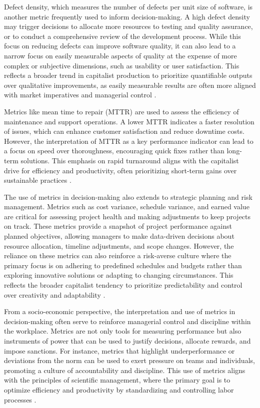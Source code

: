 \begin{refsection}
Defect density, which measures the number of defects per unit size of software, is another metric frequently used to inform decision-making. A high defect density may trigger decisions to allocate more resources to testing and quality assurance, or to conduct a comprehensive review of the development process. While this focus on reducing defects can improve software quality, it can also lead to a narrow focus on easily measurable aspects of quality at the expense of more complex or subjective dimensions, such as usability or user satisfaction. This reflects a broader trend in capitalist production to prioritize quantifiable outputs over qualitative improvements, as easily measurable results are often more aligned with market imperatives and managerial control \cite[pp.~47-49]{McConnell2004CodeComplete}.

Metrics like mean time to repair (MTTR) are used to assess the efficiency of maintenance and support operations. A lower MTTR indicates a faster resolution of issues, which can enhance customer satisfaction and reduce downtime costs. However, the interpretation of MTTR as a key performance indicator can lead to a focus on speed over thoroughness, encouraging quick fixes rather than long-term solutions. This emphasis on rapid turnaround aligns with the capitalist drive for efficiency and productivity, often prioritizing short-term gains over sustainable practices \cite[pp.~233-236]{Allspaw2010WebOperations}.

The use of metrics in decision-making also extends to strategic planning and risk management. Metrics such as cost variance, schedule variance, and earned value are critical for assessing project health and making adjustments to keep projects on track. These metrics provide a snapshot of project performance against planned objectives, allowing managers to make data-driven decisions about resource allocation, timeline adjustments, and scope changes. However, the reliance on these metrics can also reinforce a risk-averse culture where the primary focus is on adhering to predefined schedules and budgets rather than exploring innovative solutions or adapting to changing circumstances. This reflects the broader capitalist tendency to prioritize predictability and control over creativity and adaptability \cite[pp.~110-113]{Fleming2005EarnedValue}.

From a socio-economic perspective, the interpretation and use of metrics in decision-making often serve to reinforce managerial control and discipline within the workplace. Metrics are not only tools for measuring performance but also instruments of power that can be used to justify decisions, allocate rewards, and impose sanctions. For instance, metrics that highlight underperformance or deviations from the norm can be used to exert pressure on teams and individuals, promoting a culture of accountability and discipline. This use of metrics aligns with the principles of scientific management, where the primary goal is to optimize efficiency and productivity by standardizing and controlling labor processes \cite[pp.~55-57]{Taylor2009ScientificManagement}.


\end{refsection}
